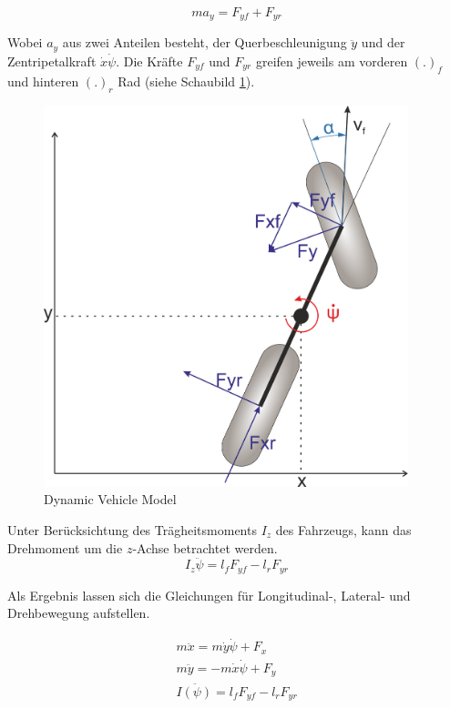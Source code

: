 \documentclass{like}
\begin{document}
\begin{equation}
ma_y = F_{yf} + F_{yr}
\end{equation}   


Wobei \(a_y\) aus zwei Anteilen besteht, der Querbeschleunigung \(\ddot{y}\) und der Zentripetalkraft \(\dot{x} \dot{\psi}\).  
Die Kräfte \(F_{yf}\) und \(F_{yr}\) greifen jeweils am vorderen \((.)_f\) und hinteren \((.)_r\) Rad (siehe Schaubild \ref{fig:dynModel}). 

\begin{figure}[hb!]
	\centering
	\includegraphics[width=300pt]{Abbildungen/dynBicycle.png}
	\caption{Dynamic Vehicle Model}
	\label{fig:dynModel}
\end{figure}




Unter Berücksichtung des Trägheitsmoments \(I_z\) des Fahrzeugs, kann das Drehmoment um die \(z\)-Achse betrachtet werden.
\begin{equation}
I_z \ddot{\psi} = l_f F_{yf} - l_r F_{yr}
\end{equation}

Als Ergebnis lassen sich die Gleichungen für Longitudinal-, Lateral- und Drehbewegung aufstellen.

\begin{eqnarray}
m \ddot{x} = m \dot{y} \dot{\psi} + F_x \\
m \ddot{y} = - m \dot{x} \dot{\psi} + F_y \\
I \ddot{(\psi)} = l_f F_{yf} - l_r F_{yr}
\end{eqnarray}
\end{document}
